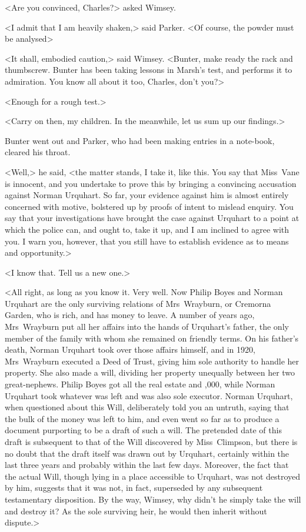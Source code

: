 <Are you convinced, Charles?> asked Wimsey.

<I admit that I am heavily shaken,> said Parker. <Of course, the powder must be analysed\longdash>

<It shall, embodied caution,> said Wimsey. <Bunter, make ready the rack and thumbscrew. Bunter has been taking lessons in Marsh's test, and performs it to admiration. You know all about it too, Charles, don't you?>

<Enough for a rough test.>

<Carry on then, my children. In the meanwhile, let us sum up our findings.>

Bunter went out and Parker, who had been making entries in a note-book, cleared his throat.

<Well,> he said, <the matter stands, I take it, like this. You say that Miss~Vane is innocent, and you undertake to prove this by bringing a convincing accusation against Norman Urquhart. So far, your evidence against him is almost entirely concerned with motive, bolstered up by proofs of intent to mislead enquiry. You say that your investigations have brought the case against Urquhart to a point at which the police can, and ought to, take it up, and I am inclined to agree with you. I warn you, however, that you still have to establish evidence as to means and opportunity.>

<I know that. Tell us a new one.>

<All right, as long as you know it. Very well. Now Philip Boyes and Norman Urquhart are the only surviving relations of Mrs~Wrayburn, or Cremorna Garden, who is rich, and has money to leave. A number of years ago, Mrs~Wrayburn put all her affairs into the hands of Urquhart's father, the only member of the family with whom she remained on friendly terms. On his father's death, Norman Urquhart took over those affairs himself, and in 1920, Mrs~Wrayburn executed a Deed of Trust, giving him sole authority to handle her property. She also made a will, dividing her property unequally between her two great-nephews. Philip Boyes got all the real estate and ,000, while Norman Urquhart took whatever was left and was also sole executor. Norman Urquhart, when questioned about this Will, deliberately told you an untruth, saying that the bulk of the money was left to him, and even went so far as to produce a document purporting to be a draft of such a will. The pretended date of this draft is subsequent to that of the Will discovered by Miss~Climpson, but there is no doubt that the draft itself was drawn out by Urquhart, certainly within the last three years and probably within the last few days. Moreover, the fact that the actual Will, though lying in a place accessible to Urquhart, was not destroyed by him, suggests that it was not, in fact, superseded by any subsequent testamentary disposition. By the way, Wimsey, why didn't he simply take the will and destroy it? As the sole surviving heir, he would then inherit without dispute.>

